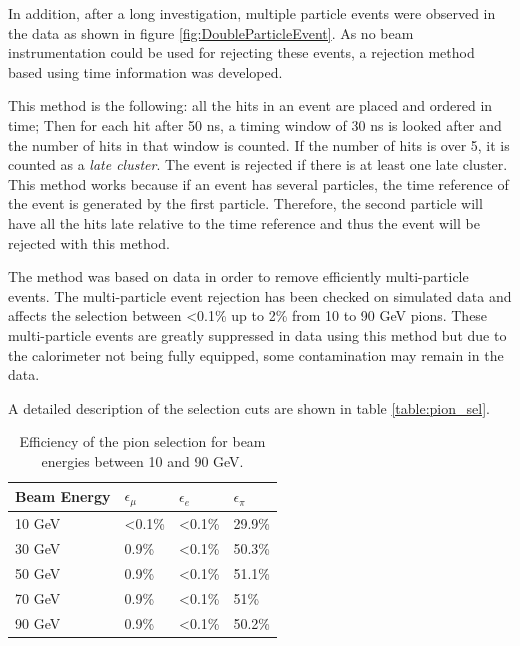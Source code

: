 In addition, after a long investigation, multiple particle events were observed in the data as shown in figure \ref{fig:DoubleParticleEvent}. As no beam instrumentation could be used for rejecting these events, a rejection method based using time information was developed.

This method is the following: all the hits in an event are placed and ordered in time; Then for each hit after 50 ns, a timing window of 30 ns is looked after and the number of hits in that window is counted. If the number of hits is over 5, it is counted as a \textit{late cluster}. The event is rejected if there is at least one late cluster. This method works because if an event has several particles, the time reference of the event is generated by the first particle. Therefore, the second particle will have all the hits late relative to the time reference and thus the event will be rejected with this method.

The method was based on data in order to remove efficiently multi-particle events. The multi-particle event rejection has been checked on simulated data and affects the selection between <0.1\% up to 2\% from 10 to 90 GeV pions. These multi-particle events are greatly suppressed in data using this method but due to the calorimeter not being fully equipped, some contamination may remain in the data.

A detailed description of the selection cuts are shown in table \ref{table:pion_sel}.

\begin{table}[htb!]
	\centering
	\caption{Efficiency of the pion selection for beam energies between 10 and 90 GeV.}
	\label{table:eff_pion}
	\begin{tabular}{@{} llll @{}}
		\toprule
		\textbf{Beam Energy} & \textbf{$\epsilon_{\mu}$} & \textbf{$\epsilon_{e}$} & \textbf{$\epsilon_{\pi}$}\\
		\midrule
		10 GeV & <0.1\% & <0.1\% & 29.9\%\\
		30 GeV & 0.9\% & <0.1\% & 50.3\%\\
		50 GeV & 0.9\% & <0.1\% & 51.1\%\\
		70 GeV & 0.9\% & <0.1\% & 51\%\\
		90 GeV & 0.9\% & <0.1\% & 50.2\%\\
		\bottomrule
	\end{tabular}
\end{table}

